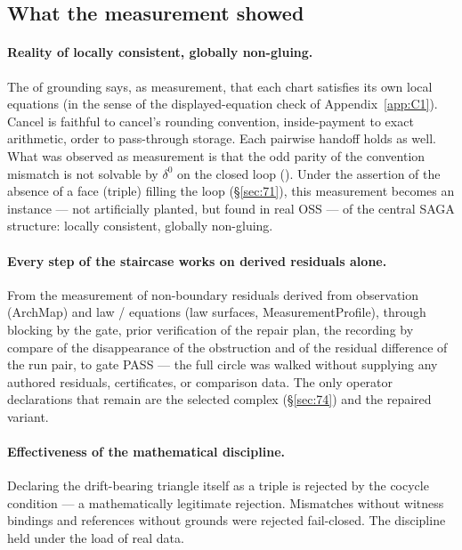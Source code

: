 \subsection{What the measurement showed}\label{sec:73}

\paragraph{Reality of locally consistent, globally non-gluing.}
The  of grounding says, as measurement, that each
chart satisfies its own local equations (in the sense of the
displayed-equation check of Appendix~\ref{app:C1}). Cancel is faithful to
cancel's rounding convention, inside-payment to exact arithmetic,
order to pass-through storage. Each pairwise handoff holds as well.
What was observed as measurement is that the odd parity of the
convention mismatch is not solvable by $\delta^0$ on the closed loop
(). Under the assertion of the absence of a face
(triple) filling the loop (\S\ref{sec:71}), this measurement becomes
an instance --- not artificially planted, but found in real OSS --- of
the central SAGA structure: locally consistent, globally non-gluing.

\paragraph{Every step of the staircase works on derived residuals alone.}
From the measurement of non-boundary residuals derived from
observation (ArchMap) and law / equations (law surfaces,
MeasurementProfile), through blocking by the gate, prior verification
of the repair plan, the recording by compare of the disappearance of
the obstruction and of the residual difference of the run pair, to
gate PASS --- the full circle was walked without supplying any
authored residuals, certificates, or comparison data. The only operator
declarations that remain are the selected complex (\S\ref{sec:74})
and the repaired variant.

\paragraph{Effectiveness of the mathematical discipline.}
Declaring the drift-bearing triangle itself as a triple is rejected by
the cocycle condition --- a mathematically legitimate rejection.
Mismatches without witness bindings and references without grounds
were rejected fail-closed. The discipline held under the load of real data.

